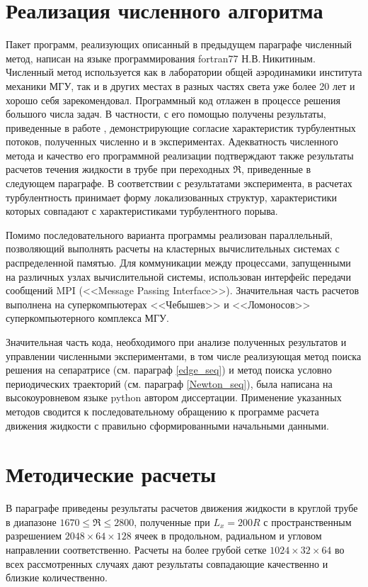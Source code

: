 \section{Реализация численного алгоритма}

Пакет программ, реализующих описанный в предыдущем параграфе численный метод, написан на языке программирования fortran77 Н.В.\,Никитиным. Численный метод используется как в лаборатории общей аэродинамики института механики МГУ, так и в других местах в разных частях света уже более 20 лет и хорошо себя зарекомендовал. Программный код отлажен в процессе решения большого числа задач. В частности, с его помощью получены результаты, приведенные в работе \cite{Nikitin2006}, демонстрирующие согласие характеристик турбулентных потоков, полученных численно и в экспериментах. Адекватность численного метода и качество его программной реализации подтверждают также результаты расчетов течения жидкости в трубе при переходных $\Re$, приведенные в следующем параграфе. В соответствии с результатами эксперимента, в расчетах турбулентность принимает форму локализованных структур, характеристики которых совпадают с характеристиками турбулентного порыва.

Помимо последовательного варианта программы реализован параллельный, позволяющий выполнять расчеты на кластерных вычислительных системах с распределенной памятью. Для коммуникации между процессами, запущенными на различных узлах вычислительной системы, использован интерфейс передачи сообщений MPI (<<Message Passing Interface>>). Значительная часть расчетов выполнена на суперкомпьютерах <<Чебышев>> и <<Ломоносов>> суперкомпьютерного комплекса МГУ. 

Значительная часть кода, необходимого при анализе полученных результатов и управлении численными экспериментами, в том числе реализующая метод поиска решения на сепаратрисе (см. параграф \ref{edge_seq}) и метод поиска условно периодических траекторий (см. параграф \ref{Newton_seq}), была написана на высокоуровневом языке python автором диссертации. Применение указанных методов сводится к последовательному обращению к программе расчета движения жидкости с правильно сформированными начальными данными. 


\section{Методические расчеты} \label{puff_calc}

В параграфе приведены результаты расчетов движения жидкости в круглой трубе в диапазоне $1670 \leqslant \Re \leqslant 2800$, полученные при $L_x=200R$ с пространственным разрешением $2048 \times 64 \times 128$ ячеек в продольном, радиальном и угловом направлении соответственно. Расчеты на более грубой сетке $1024 \times 32 \times 64$ во всех рассмотренных случаях дают результаты совпадающие качественно и близкие количественно.

